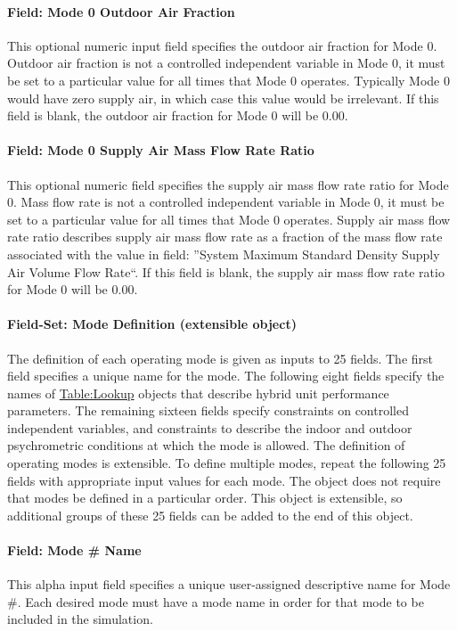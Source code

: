 \paragraph{Field: Mode 0 Outdoor Air Fraction}
This optional numeric input field specifies the outdoor air fraction for Mode 0. Outdoor air fraction is not a controlled independent variable in Mode 0, it must be set to a particular value for all times that Mode 0 operates. Typically Mode 0 would have zero supply air, in which case this value would be irrelevant. If this field is blank, the outdoor air fraction for Mode 0 will be 0.00.

\paragraph{Field: Mode 0 Supply Air Mass Flow Rate Ratio}
This optional numeric field specifies the supply air mass flow rate ratio for Mode 0. Mass flow rate is not a controlled independent variable in Mode 0, it must be set to a particular value for all times that Mode 0 operates. Supply air mass flow rate ratio describes supply air mass flow rate as a fraction of the mass flow rate associated with the value in field: ''System Maximum Standard Density Supply Air Volume Flow Rate``. If this field is blank, the supply air mass flow rate ratio for Mode 0 will be 0.00.

\paragraph{Field-Set: Mode Definition (extensible object)}
The definition of each operating mode is given as inputs to 25 fields. The first field specifies a unique name for the mode. The following eight fields specify the names of \hyperref[tablelookup]{Table:Lookup} objects that describe hybrid unit performance parameters. The remaining sixteen fields specify constraints on controlled independent variables, and constraints to describe the indoor and outdoor psychrometric conditions at which the mode is allowed. The definition of operating modes is extensible. To define multiple modes, repeat the following 25 fields with appropriate input values for each mode. The object does not require that modes be defined in a particular order. This object is extensible, so additional groups of these 25 fields can be added to the end of this object.

\paragraph{Field: Mode \# Name}
This alpha input field specifies a unique user-assigned descriptive name for Mode \#. Each desired mode must have a mode name in order for that mode to be included in the simulation.

